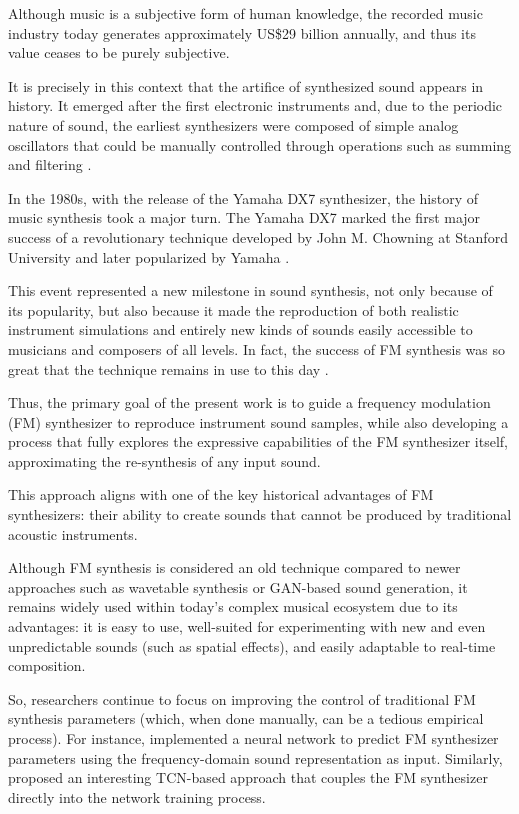 \documentclass[10pt,conference]{IEEEtran}
\begin{document}
Although music is a subjective form of human knowledge, the recorded music industry today generates approximately US\$29 billion \cite{ifpi2025} annually, and thus its value ceases to be purely subjective.

It is precisely in this context that the artifice of synthesized sound appears in history. It emerged after the first electronic instruments and, due to the periodic nature of sound, the earliest synthesizers were composed of simple analog oscillators that could be manually controlled through operations such as summing and filtering \cite{holmes2016electronic}.

In the 1980s, with the release of the Yamaha DX7 synthesizer, the history of music synthesis took a major turn. The Yamaha DX7 marked the first major success of a revolutionary technique developed by John M. Chowning at Stanford University and later popularized by Yamaha \cite{claesson2021resynthesis}.

This event represented a new milestone in sound synthesis, not only because of its popularity, but also because it made the reproduction of both realistic instrument simulations and entirely new kinds of sounds easily accessible to musicians and composers of all levels. In fact, the success of FM synthesis was so great that the technique remains in use to this day \cite{holmes2016electronic}.

Thus, the primary goal of the present work is to guide a frequency modulation (FM) synthesizer to reproduce instrument sound samples, while also developing a process that fully explores the expressive capabilities of the FM synthesizer itself, approximating the re-synthesis of any input sound.

This approach aligns with one of the key historical advantages of FM synthesizers: their ability to create sounds that cannot be produced by traditional acoustic instruments.

Although FM synthesis is considered an old technique compared to newer approaches such as wavetable synthesis or GAN-based sound generation, it remains widely used within today’s complex musical ecosystem due to its advantages: it is easy to use, well-suited for experimenting with new and even unpredictable sounds (such as spatial effects), and easily adaptable to real-time composition.

So, researchers continue to focus on improving the control of traditional FM synthesis parameters (which, when done manually, can be a tedious empirical process). For instance, \cite{claesson2021resynthesis} implemented a neural network to predict FM synthesizer parameters using the frequency-domain sound representation as input. Similarly, \cite{steinmetz2022ddx7} proposed an interesting TCN-based approach that couples the FM synthesizer directly into the network training process.
\end{document}

